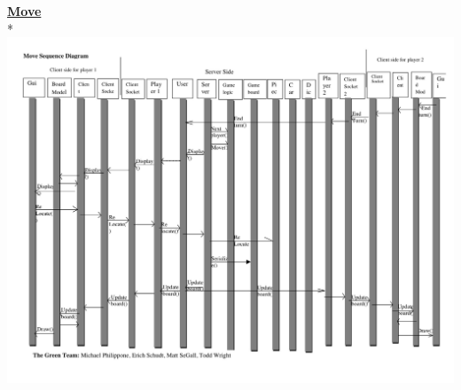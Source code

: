 \begin{flushleft}
	\newpage
%
	{\Large \underline{\textbf{Move}}} \\*
	\includegraphics[angle=90, scale=.75]{../DesignDocumentation/08_SequenceDiagrams/moveSequence.jpg} %
	\newpage
%
\end{flushleft}
